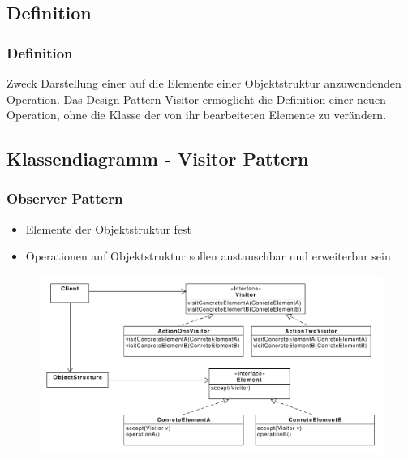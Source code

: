 \subsection{Definition}
\begin{frame}
  \frametitle{Definition}
  \begin{block}{Zweck}
  	Darstellung einer auf die Elemente einer Objektstruktur anzuwendenden Operation. Das
Design Pattern Visitor ermöglicht die Definition einer neuen Operation, ohne die Klasse der
von ihr bearbeiteten Elemente zu verändern.%
  \end{block}
  
\end{frame}

\subsection{Klassendiagramm - Visitor Pattern}
\begin{frame}
	\frametitle{Observer Pattern}		
	\begin{itemize}
		\item Elemente der Objektstruktur fest
		\item Operationen auf Objektstruktur sollen austauschbar und erweiterbar sein
	\end{itemize}	
  	\begin{figure}
		\includegraphics[scale=.3]{paper/visitor/visitor}
	\end{figure}
\end{frame}

